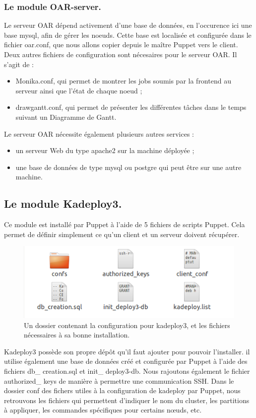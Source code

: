 \documentclass[a4paper,10pt]{article}
\begin{document}
			\subsubsection{Le module OAR-server.}
		Le serveur OAR dépend activement d'une base de données, en l'occurence ici une base mysql, afin de gérer les noeuds. Cette base est localisée et configurée dans le fichier oar.conf, que nous allons copier depuis le maître Puppet vers le client.
		Deux autres fichiers de configuration sont nécesaires pour le serveur OAR. Il s'agit de : \begin{itemize}
		\item Monika.conf, qui permet de montrer les jobs soumis par la frontend au serveur ainsi que l'état de chaque noeud ;
		\item drawgantt.conf, qui permet de présenter les différentes tâches dans le temps suivant un Diagramme de Gantt.
\end{itemize}
Le serveur OAR nécessite également plusieurs autres services :
\begin{itemize}
\item un serveur Web du type apache2 sur la machine déployée ;
\item une base de données de type mysql ou postgre qui peut être sur une autre machine.
\end{itemize}
			\subsection{Le module Kadeploy3.}
			Ce module est installé par Puppet à l'aide de 5 fichiers de scripts Puppet. Cela permet de définir simplement ce qu'un client et un serveur doivent récupérer.
		\begin{figure}[!h]
			\centering
			\includegraphics[scale=0.7]{fich_kade.png}
			\caption{Un dossier contenant la configuration pour kadeploy3, et les fichiers nécessaires à sa bonne installation.}
			\label{Installation kadeploy3}
		\end{figure}
			\newpage Kadeploy3 possède son propre dép\^ot qu'il faut ajouter pour pouvoir l'installer. il utilise également une base de données créé et configurée par Puppet à l'aide des fichiers db\_ creation.sql et init\_ deploy3-db. Nous rajoutons également le fichier authorized\_ keys de manière à permettre une communication SSH. Dans le dossier conf des fichers utiles à la configuration de kadeploy par Puppet, nous retrouvons les fichiers qui permettent d'indiquer le nom du cluster, les partitions à appliquer, les commandes spécifiques pour certains n\oe uds, etc.
\end{document}
